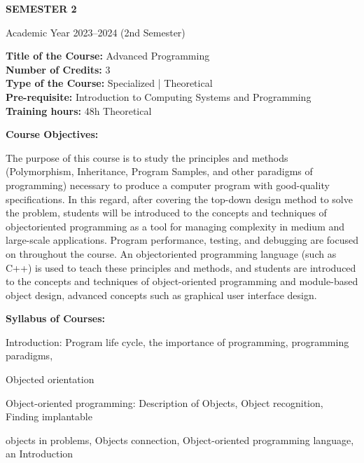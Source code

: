 \documentclass[12pt,a4paper]{article}
\begin{document}
\newpage
\vspace*{\fill}
\begin{center}
  {\fontsize{28pt}{34pt}\selectfont \textbf{SEMESTER 2}}\par\vspace{12pt}
  {\fontsize{13pt}{17pt}\selectfont Academic Year 2023–2024 (2nd Semester)}
\end{center}
\vspace*{\fill}

\newpage
\textbf{Title of the Course:} Advanced Programming\\
\textbf{Number of Credits:} 3\\
\textbf{Type of the Course:} Specialized | Theoretical\\
\textbf{Pre-requisite:} Introduction to Computing Systems and Programming\\
\textbf{Training hours:} 48h Theoretical\par\vspace{4pt}
\textbf{Course Objectives:}\par\vspace{2pt}
The purpose of this course is to study the principles and methods (Polymorphism, Inheritance,
Program Samples, and other paradigms of programming) necessary to produce a computer
program with good-quality specifications. In this regard, after covering the top-down design
method to solve the problem, students will be introduced to the concepts and techniques of objectoriented programming as a tool for managing complexity in medium and large-scale applications.
Program performance, testing, and debugging are focused on throughout the course. An objectoriented programming language (such as C++) is used to teach these principles and methods, and
students are introduced to the concepts and techniques of object-oriented programming and
module-based object design, advanced concepts such as graphical user interface design.\par\vspace{4pt}
\textbf{Syllabus of Courses:}\par\vspace{2pt}
Introduction: Program life cycle, the importance of programming, programming paradigms,\par
Objected orientation\par
Object-oriented programming: Description of Objects, Object recognition, Finding implantable\par
objects in problems, Objects connection, Object-oriented programming language, an Introduction\par
\end{document}
